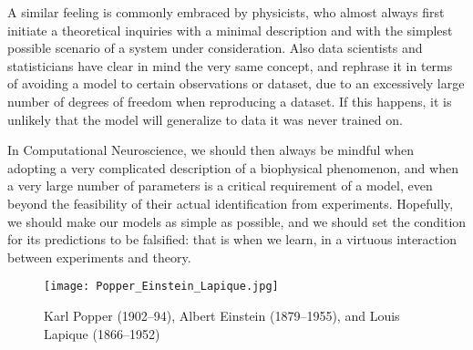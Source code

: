 A similar feeling is commonly embraced by physicists, who almost always first initiate a theoretical inquiries with a minimal description and with the simplest possible scenario of a system under consideration. Also data scientists and statisticians have clear in mind the very same concept, and rephrase it in terms of avoiding  a model to certain observations or dataset, due to an excessively large number of degrees of freedom when reproducing a dataset. If this happens, it is unlikely that the model will generalize to data it was never trained on.


In Computational Neuroscience, we should then always be mindful when adopting a very complicated description of a biophysical phenomenon, and when a very large number of parameters is a critical requirement of a model, even beyond the feasibility of their actual identification from experiments. Hopefully, we should make our models as simple as possible, and we should set the condition for its predictions to be falsified: that is when we learn, in a virtuous interaction between experiments and theory.

\begin{figure}[t]
	\sidecaption[t]
	\centering
	\texttt{[image: Popper\_Einstein\_Lapique.jpg]}
	\caption{Karl Popper (1902--94), Albert Einstein (1879--1955), and Louis Lapique (1866--1952)}
	\label{fig3:PopperEinsteinLapique}       %
	\end{figure}



